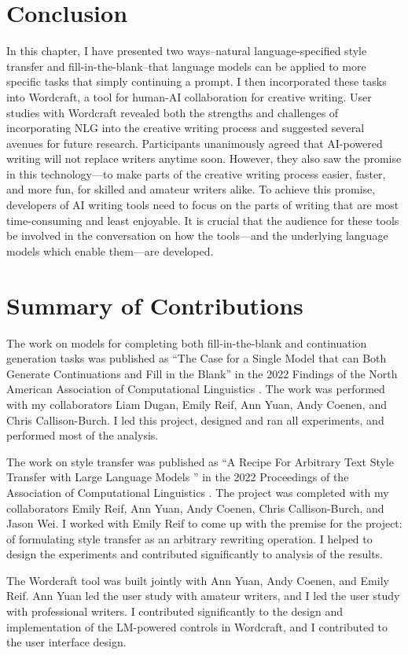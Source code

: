 \section{Conclusion}
In this chapter, I have presented two ways--natural language-specified style transfer and fill-in-the-blank--that language models can be applied to more specific tasks that simply continuing a prompt.
I then incorporated these tasks into Wordcraft, a tool for human-AI collaboration for creative writing.
User studies with Wordcraft revealed both the strengths and challenges of incorporating NLG into the creative writing process and suggested several avenues for future research.
Participants unanimously agreed that AI-powered writing will not
replace writers anytime soon.
However, they also saw the promise in this technology---to make parts of the creative writing process easier, faster, and more fun, for skilled and amateur writers alike.
To achieve this promise, developers of AI writing tools need to focus on the parts of writing that are
most time-consuming and least enjoyable.
It is crucial that the audience for these tools be involved in the conversation on how the tools---and the underlying language models which enable them---are developed.


\section{Summary of Contributions}
The work on models for completing both fill-in-the-blank and continuation generation tasks was published as ``The Case for a Single Model that can Both Generate Continuations and Fill in the Blank'' in the 2022 Findings of the North American Association of Computational Linguistics \citep{fitb_fite}.
The work was performed with my collaborators Liam Dugan, Emily Reif, Ann Yuan, Andy Coenen, and Chris Callison-Burch.
I led this project, designed and ran all experiments, and performed most of the analysis.

The work on style transfer was published as ``A Recipe For Arbitrary Text Style Transfer with Large Language Models
'' in the 2022 Proceedings of the Association of Computational Linguistics \citep{reif2021recipe}.
The project was completed with my collaborators Emily Reif, Ann Yuan, Andy Coenen, Chris Callison-Burch, and Jason Wei.
I worked with Emily Reif to come up with the premise for the project: of formulating style transfer as an arbitrary rewriting operation.
I helped to design the experiments and contributed significantly to analysis of the results.

The Wordcraft tool was built jointly with Ann Yuan, Andy Coenen, and Emily Reif.
Ann Yuan led the user study with amateur writers, and I led the user study with professional writers.
I contributed significantly to the design and implementation of the LM-powered controls in Wordcraft, and I contributed to the user interface design.
